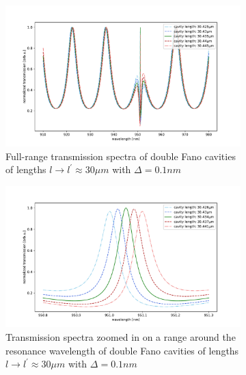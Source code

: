 \begin{figure}[h!]
    \centering
    \begin{subfigure}[b]{0.49\textwidth}
        \includegraphics[width=\textwidth]{figures/small_detuning_length_scan_short.pdf}
        \caption{Full-range transmission spectra of double Fano cavities of lengths $l \rightarrow l^{\prime} \approx 30 \mu m$ with $\Delta = 0.1nm$}
        \label{fig:detuned_small_length_scan_long}
    \end{subfigure}
    \begin{subfigure}[b]{0.49\textwidth}
        \includegraphics[width=\textwidth]{figures/small_detuning_length_scan_long.pdf}
        \caption{Transmission spectra zoomed in on a range around the resonance wavelength of double Fano cavities of lengths $l \rightarrow l^{\prime} \approx 30 \mu m$ with $\Delta = 0.1nm$}
        \label{fig:detuned_small_length_scan_short}
    \end{subfigure}
    \caption{}
    \label{fig:small_detuning_length_scans}
\end{figure}

